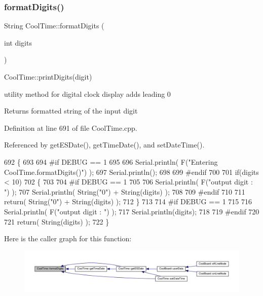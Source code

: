 \subsubsection{\texorpdfstring{format\+Digits()}{formatDigits()}}
{\footnotesize\ttfamily String Cool\+Time\+::format\+Digits (\begin{DoxyParamCaption}\item[{int}]{digits }\end{DoxyParamCaption})}

Cool\+Time\+::print\+Digits(digit)

utility method for digital clock display adds leading 0

\begin{DoxyReturn}{Returns}
formatted string of the input digit 
\end{DoxyReturn}


Definition at line 691 of file Cool\+Time.\+cpp.



Referenced by get\+E\+S\+Date(), get\+Time\+Date(), and set\+Date\+Time().


\begin{DoxyCode}
692 \{
693 
694 \textcolor{preprocessor}{#if DEBUG == 1 }
695 
696     Serial.println( F(\textcolor{stringliteral}{"Entering CoolTime.formatDigits()"}) );
697     Serial.println();
698 
699 \textcolor{preprocessor}{#endif }
700 
701     \textcolor{keywordflow}{if}(digits < 10)
702     \{
703     
704 \textcolor{preprocessor}{    #if DEBUG == 1}
705 
706         Serial.println( F(\textcolor{stringliteral}{"output digit : "}) );
707         Serial.println( String(\textcolor{stringliteral}{"0"}) + String(digits) );
708 
709 \textcolor{preprocessor}{    #endif}
710 
711         \textcolor{keywordflow}{return}( String(\textcolor{stringliteral}{"0"}) + String(digits) );
712     \}
713     
714 \textcolor{preprocessor}{#if DEBUG == 1 }
715 
716     Serial.println( F(\textcolor{stringliteral}{"output digit : "}) );
717     Serial.println(digits);
718 
719 \textcolor{preprocessor}{#endif}
720 
721     \textcolor{keywordflow}{return}( String(digits) );
722 \}
\end{DoxyCode}
Here is the caller graph for this function\+:\nopagebreak
\begin{figure}[H]
\begin{center}
\leavevmode
\includegraphics[width=350pt]{classCoolTime_acd537cd4210d7bde4e1f5c47d2ac0456_icgraph}
\end{center}
\end{figure}
\mbox{\label{classCoolTime_ac4f32ee513c1328d984306645e8785a4}} 
